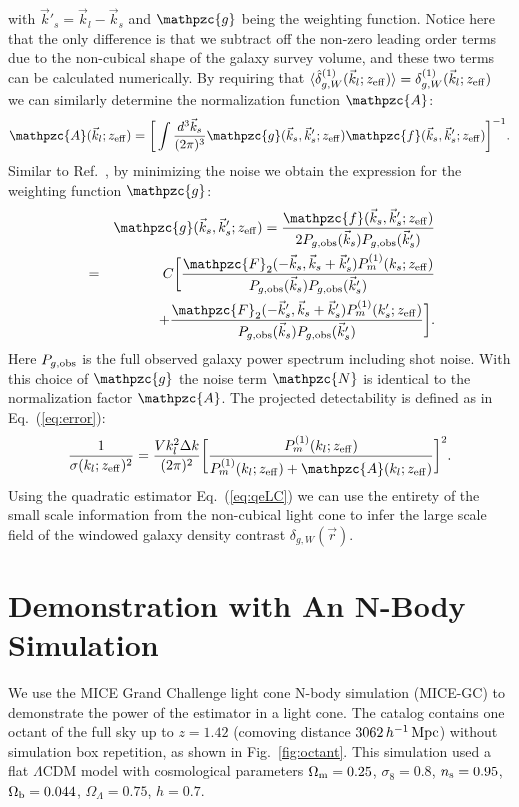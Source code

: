 \documentclass[prd,amsmath,amssymb,floatfix,superscriptaddress,nofootinbib,twocolumn]{revtex4-1}
\newcommand{\vrr}{\vec{r}}
\newcommand{\vs}{\nonumber\\}
\newcommand{\ec}[1]{Eq.~(\ref{eq:#1})}
\newcommand{\eql}[1]{\label{eq:#1}}
\newcommand{\rf}[1]{\ref{fig:#1}}
\begin{document}
with $\vec{k}'_s = \vec{k}_l-\vec{k}_s$ and $\mathpzc{g}$ being the weighting function. Notice here that the only difference is that we subtract off the non-zero leading order terms due to the non-cubical shape of the galaxy survey
volume, and these two terms can be calculated numerically. By requiring that $\langle \hat{\delta}^{(1)}_{g,W}(\vec{k}_l;z_{\rm eff})\rangle = {\delta}^{(1)}_{g,W}(\vec{k}_l;z_{\rm eff})$ we can similarly determine the normalization function $\mathpzc{A}$:
\begin{eqnarray}
\mathpzc{A}(\vec{k}_l;z_{\rm eff})=\bigg[ \int \frac{d^{3}\vec{k}_s}{(2\pi)^3}\mathpzc{g}(\vec{k}_s,\vec{k}'_s;z_{\rm eff})\mathpzc{f}(\vec{k}_s,\vec{k}'_s;z_{\rm eff}) \bigg]^{-1}.\vs
\end{eqnarray}
Similar to Ref.~\cite{Li:2020fir}, by minimizing the noise we obtain the expression for the weighting function $\mathpzc{g}$:
\begin{eqnarray}
&&\mathpzc{g}(\vec{k}_s,\vec{k}'_s;z_{\rm eff})=\frac{\mathpzc{f}(\vec{k}_s,\vec{k}'_s;z_{\rm eff})}{2P_{g,\rm obs}(\vec{k}_s)P_{g,\rm obs}(\vec{k}'_s)}\vs
&=&C\bigg[\frac{\mathpzc{F}_2(-\vec{k}_s,\vec{k}_s+\vec{k}'_s)P_{m}^{(1)}(k_s;z_{\rm eff})}{P_{g,\rm obs}(\vec{k}_s)P_{g,\rm obs}(\vec{k}'_s)}\vs
&&\, +\frac{\mathpzc{F}_2(-\vec{k}'_s,\vec{k}_s+\vec{k}'_s)P_{m}^{(1)}(k'_s;z_{\rm eff})}{P_{g,\rm obs}(\vec{k}_s)P_{g,\rm obs}(\vec{k}'_s)}\bigg].
\end{eqnarray}
Here $P_{g,\rm obs}$ is the full observed galaxy power spectrum including shot noise. With this choice of $\mathpzc{g}$ the noise term $\mathpzc{N}$ is identical to the normalization factor $\mathpzc{A}$. The projected detectability is defined as in \ec{error}:
\begin{eqnarray}
\frac{1}{\sigma(k_l;z_{\rm eff})^2}=\frac{Vk_l^2\Delta k}{(2\pi)^2}\bigg[\frac{P_{m}^{(1)}(k_l;z_{\rm eff})}{P_{m}^{(1)}(k_l;z_{\rm eff})+\mathpzc{A}(k_l;z_{\rm eff}) }\bigg]^2 .\vs\eql{errorLC}
\end{eqnarray}
Using the quadratic estimator \ec{qeLC} we can use the entirety of the small scale information from the non-cubical light cone to infer the large scale field of the windowed galaxy density contrast $\delta_{g,W}(\vrr)$.

\section{Demonstration with An N-Body Simulation} \label{sec4}
\noindent We use the MICE Grand Challenge light cone N-body simulation (MICE-GC) \cite{Fosalba:2015MI}\cite{Fosalba:2015MII}\cite{Fosalba:2013mra} to demonstrate the power of the estimator in a light cone. The catalog contains one octant of the full sky up to $z = 1.42$ (comoving distance $3062\, h^{-1}\, \rm Mpc$) without simulation box repetition, as shown in Fig.~\rf{octant}. This simulation used a flat $\Lambda$CDM model with cosmological parameters $ \Omega_{\rm m}=0.25$, $\sigma_8 = 0.8$, $n_{\rm s}=0.95$, $\Omega_{\rm b}=0.044$, $\Omega_{\Lambda}=0.75$, $h=0.7$. 
\end{document}
